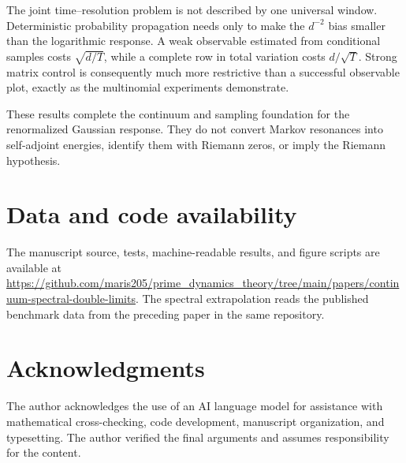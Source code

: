 \documentclass[11pt]{article}
\theoremstyle{definition}
\theoremstyle{remark}
\begin{document}
The joint time--resolution problem is not described by one universal window.
Deterministic probability propagation needs only to make the $d^{-2}$ bias
smaller than the logarithmic response.  A weak observable estimated from
conditional samples costs $\sqrt{d/T}$, while a complete row in total
variation costs $d/\sqrt T$.  Strong matrix control is consequently much more
restrictive than a successful observable plot, exactly as the multinomial
experiments demonstrate.

These results complete the continuum and sampling foundation for the
renormalized Gaussian response.  They do not convert Markov resonances into
self-adjoint energies, identify them with Riemann zeros, or imply the Riemann
hypothesis.

\section*{Data and code availability}

The manuscript source, tests, machine-readable results, and figure scripts
are available at
\url{https://github.com/maris205/prime_dynamics_theory/tree/main/papers/continuum-spectral-double-limits}.
The spectral extrapolation reads the published benchmark data from the
preceding paper in the same repository.

\section*{Acknowledgments}

The author acknowledges the use of an AI language model for assistance with
mathematical cross-checking, code development, manuscript organization, and
typesetting.  The author verified the final arguments and assumes
responsibility for the content.

{\small


}
\end{document}
